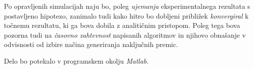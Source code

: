 \documentclass[a4paper]{article}
\begin{document}
Po opravljenih simulacijah naju bo, poleg \textit{ujemanja} eksperimentalnega rezultata s postavljeno hipotezo, zanimalo tudi kako hitro bo dobljeni približek \textit{konvergiral} k točnemu  rezultatu, ki ga bova dobila z analitičnim pristopom. Poleg tega bova pozorna tudi na \textit{časovno zahtevnost} napisanih algoritmov in njihovo obnašanje v odvisnosti od izbire načina generiranja naključnih premic. 

Delo bo potekalo v programskem okolju \textit{Matlab}.

 
\end{document}
